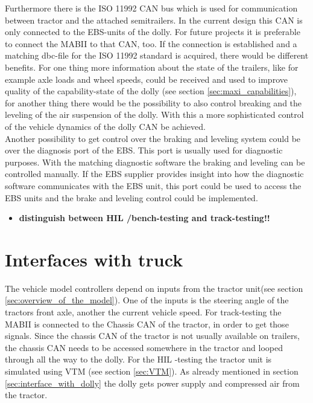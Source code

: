 \documentclass[ExampleMasters.tex]{subfiles}
\begin{document}
	Furthermore there is the ISO 11992 \gls{CAN} bus which is used for communication between tractor and the attached semitrailers. In the current design this \gls{CAN} is only connected to the EBS-units of the dolly. For future projects it is preferable to connect the \gls{MABII} to that \gls{CAN}, too. If the connection is established and a matching dbc-file for the ISO 11992 standard is acquired, there would be different benefits. For one thing more information about the state of the trailers, like for example axle loads and wheel speeds, could be received and used to improve quality of the capability-state of the dolly (see section \ref{sec:maxi_capabilities}), for another thing there would be the possibility to also control breaking and the leveling of the air suspension of the dolly. With this a more sophisticated control of the vehicle dynamics of the dolly \gls{CAN} be achieved.\\
	Another possibility to get control over the braking and leveling system could be over the diagnosis port of the \gls{EBS}. This port is usually used for diagnostic purposes. With the matching diagnostic software the braking and leveling can be controlled manually. If the \gls{EBS} supplier provides insight into how the diagnostic software communicates with the \gls{EBS} unit, this port could be used to access the \gls{EBS} units and the brake and leveling control could be implemented.
	
\begin{itemize}	
	\item \textbf{distinguish between \gls{HIL} /bench-testing and track-testing!!}
\end{itemize}

\section{Interfaces with truck}
\label{sec:interface_with_truck}
The vehicle model controllers depend on inputs from the tractor unit(see section \ref{sec:overview_of_the_model}). One of the inputs is the steering angle of the tractors front axle, another the current vehicle speed. For track-testing the \gls{MABII} is connected to the Chassis \gls{CAN} of the tractor, in order to get those signals. Since the chassis \gls{CAN} of the tractor is not usually available on trailers, the chassis \gls{CAN} needs to be accessed somewhere in the tractor and looped through all the way to the dolly.   
For the \gls{HIL} -testing the tractor unit is simulated using \gls{VTM}  (see section \ref{sec:VTM}). As already mentioned in section \ref{sec:interface_with_dolly} the dolly gets power supply and compressed air from the tractor.
\end{document}

